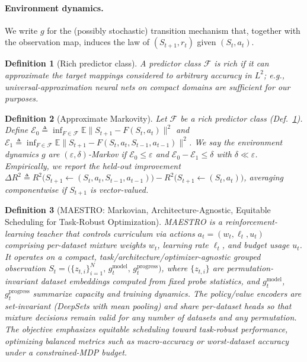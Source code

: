 \documentclass[11pt]{article}
\newtheorem{definition}{Definition}
\newcommand{\E}{\mathbb{E}}
\newcommand{\1}{\mathbf{1}}
\newcommand{\MAESTRO}{\textsc{MAESTRO}\xspace}
\begin{document}
\paragraph{Environment dynamics.}
We write $g$ for the (possibly stochastic) transition mechanism that, together with the observation map, induces the law of $(S_{t+1},r_t)$ given $(S_t,a_t)$.

\begin{definition}[Rich predictor class]\label{def:rich-class}
A predictor class $\mathcal{F}$ is \emph{rich} if it can approximate the target mappings considered to arbitrary accuracy in $L^2$; e.g., universal-approximation neural nets on compact domains are sufficient for our purposes.
\end{definition}

\begin{definition}[Approximate Markovity]
\label{def:approx-markov-tight}
Let $\mathcal{F}$ be a rich predictor class (Def.~\ref{def:rich-class}). Define
$\mathcal{E}_0 \triangleq \inf_{F\in\mathcal{F}} \E\| S_{t+1} - F(S_t,a_t)\|^2$
and
$\mathcal{E}_1 \triangleq \inf_{F\in\mathcal{F}} \E\| S_{t+1} - F(S_t,a_t,S_{t-1},a_{t-1})\|^2$.
We say the environment dynamics $g$ are $(\varepsilon,\delta)$-Markov if $\mathcal{E}_0 \le \varepsilon$ and
$\mathcal{E}_0 - \mathcal{E}_1 \le \delta$ with $\delta \ll \varepsilon$.
Empirically, we report the held-out improvement
$\Delta R^2 \triangleq R^2\!\big(S_{t+1}\!\leftarrow\!(S_t,a_t,S_{t-1},a_{t-1})\big) - R^2\!\big(S_{t+1}\!\leftarrow\!(S_t,a_t)\big)$,
averaging componentwise if $S_{t+1}$ is vector-valued.
\end{definition}

\begin{definition}[\MAESTRO: Markovian, Architecture-Agnostic, Equitable Scheduling for Task-Robust Optimization]\label{def:maestro}
\MAESTRO{} is a reinforcement-learning teacher that controls curriculum via actions
$a_t=(w_t,\ell_t,u_t)$ comprising per-dataset mixture weights $w_t$, learning rate $\ell_t$, and budget usage $u_t$.
It operates on a compact, task/architecture/optimizer-agnostic \emph{grouped} observation
$S_t=\big(\{z_{t,i}\}_{i=1}^N,\,g^{\mathrm{model}}_t,\,g^{\mathrm{progress}}_t\big)$,
where $\{z_{t,i}\}$ are permutation-invariant dataset embeddings computed from fixed probe statistics, and $g^{\mathrm{model}}_t$, $g^{\mathrm{progress}}_t$ summarize capacity and training dynamics.
The policy/value encoders are set-invariant (DeepSets with mean pooling) and share per-dataset heads so that mixture decisions remain valid for any number of datasets and any permutation.
The objective emphasizes \emph{equitable scheduling} toward task-robust performance, optimizing balanced metrics such as macro-accuracy or worst-dataset accuracy under a constrained-MDP budget.
\end{definition}
\end{document}

